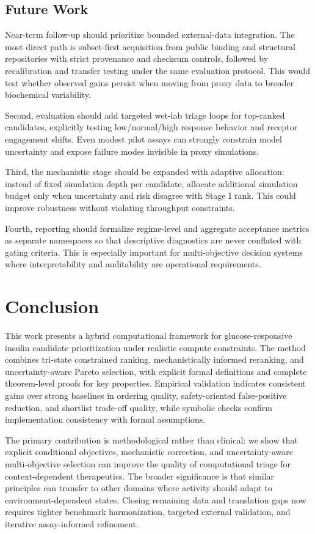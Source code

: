 \documentclass{article} %
\begin{document}
\subsection{Future Work}
Near-term follow-up should prioritize bounded external-data integration. The most direct path is subset-first acquisition from public binding and structural repositories with strict provenance and checksum controls, followed by recalibration and transfer testing under the same evaluation protocol. This would test whether observed gains persist when moving from proxy data to broader biochemical variability.

Second, evaluation should add targeted wet-lab triage loops for top-ranked candidates, explicitly testing low/normal/high response behavior and receptor engagement shifts. Even modest pilot assays can strongly constrain model uncertainty and expose failure modes invisible in proxy simulations.

Third, the mechanistic stage should be expanded with adaptive allocation: instead of fixed simulation depth per candidate, allocate additional simulation budget only when uncertainty and risk disagree with Stage I rank. This could improve robustness without violating throughput constraints.

Fourth, reporting should formalize regime-level and aggregate acceptance metrics as separate namespaces so that descriptive diagnostics are never conflated with gating criteria. This is especially important for multi-objective decision systems where interpretability and auditability are operational requirements.

\section{Conclusion}
\label{sec:conclusion}
This work presents a hybrid computational framework for glucose-responsive insulin candidate prioritization under realistic compute constraints. The method combines tri-state constrained ranking, mechanistically informed reranking, and uncertainty-aware Pareto selection, with explicit formal definitions and complete theorem-level proofs for key properties. Empirical validation indicates consistent gains over strong baselines in ordering quality, safety-oriented false-positive reduction, and shortlist trade-off quality, while symbolic checks confirm implementation consistency with formal assumptions.

The primary contribution is methodological rather than clinical: we show that explicit conditional objectives, mechanistic correction, and uncertainty-aware multi-objective selection can improve the quality of computational triage for context-dependent therapeutics. The broader significance is that similar principles can transfer to other domains where activity should adapt to environment-dependent states. Closing remaining data and translation gaps now requires tighter benchmark harmonization, targeted external validation, and iterative assay-informed refinement.
\end{document}
